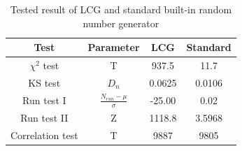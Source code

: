 \begin{table}[h]
    \centering
    \begin{tabular}{|c|c|c|c|}
    \hline
      Test  & Parameter &  LCG & Standard\\
    \hline
    $\chi^2$ test & T & 937.5 & 11.7 \\ \hline
    KS test & $D_n$ & 0.0625 & 0.0106 \\ \hline
    Run test I & $\frac{N_{run}-\mu}{\sigma}$& -25.00 &0.02\\ \hline
     Run test II   &Z & 1118.8  & 3.5968 \\ \hline
     Correlation test & T& 9887 &9805 \\ \hline
    \end{tabular}
    \caption{Tested result of LCG and standard built-in random number generator}
    \label{tab:lcg}
\end{table}